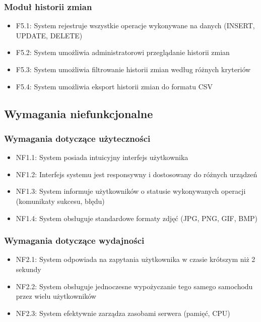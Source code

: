\documentclass[12pt,a4paper]{article}
\begin{document}
\subsubsection{Moduł historii zmian}
\begin{itemize}
    \item F5.1: System rejestruje wszystkie operacje wykonywane na danych (INSERT, UPDATE, DELETE)
    \item F5.2: System umożliwia administratorowi przeglądanie historii zmian
    \item F5.3: System umożliwia filtrowanie historii zmian według różnych kryteriów
    \item F5.4: System umożliwia eksport historii zmian do formatu CSV
\end{itemize}

\subsection{Wymagania niefunkcjonalne}

\subsubsection{Wymagania dotyczące użyteczności}
\begin{itemize}
    \item NF1.1: System posiada intuicyjny interfejs użytkownika
    \item NF1.2: Interfejs systemu jest responsywny i dostosowany do różnych urządzeń
    \item NF1.3: System informuje użytkowników o statusie wykonywanych operacji (komunikaty sukcesu, błędu)
    \item NF1.4: System obsługuje standardowe formaty zdjęć (JPG, PNG, GIF, BMP)
\end{itemize}

\subsubsection{Wymagania dotyczące wydajności}
\begin{itemize}
    \item NF2.1: System odpowiada na zapytania użytkownika w czasie krótszym niż 2 sekundy
    \item NF2.2: System obsługuje jednoczesne wypożyczanie tego samego samochodu przez wielu użytkowników
    \item NF2.3: System efektywnie zarządza zasobami serwera (pamięć, CPU)
\end{itemize}
\end{document}
